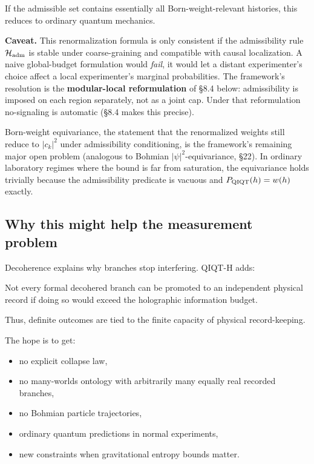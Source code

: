 \documentclass[11pt,a4paper]{article}
\newenvironment{qiqtquote}{\begin{mdframed}[style=quotestyle]}{\end{mdframed}}
\begin{document}
If the admissible set contains essentially all Born-weight-relevant histories, this reduces to ordinary quantum mechanics.

\textbf{Caveat.} This renormalization formula is only consistent if the admissibility rule $\mathcal{H}_{\rm adm}$ is stable under coarse-graining and compatible with causal localization. A naive global-budget formulation would \emph{fail}, it would let a distant experimenter's choice affect a local experimenter's marginal probabilities. The framework's resolution is the \textbf{modular-local reformulation} of §8.4 below: admissibility is imposed on each region separately, not as a joint cap. Under that reformulation no-signaling is automatic (§8.4 makes this precise).

Born-weight equivariance, the statement that the renormalized weights still reduce to $|c_k|^2$ under admissibility conditioning, is the framework's remaining major open problem (analogous to Bohmian $|\psi|^2$-equivariance, §22). In ordinary laboratory regimes where the bound is far from saturation, the equivariance holds trivially because the admissibility predicate is vacuous and $P_{\rm QIQT}(h) = w(h)$ exactly.

\subsection{Why this might help the measurement problem}

Decoherence explains why branches stop interfering. QIQT-H adds:

\begin{qiqtquote}
Not every formal decohered branch can be promoted to an independent physical record if doing so would exceed the holographic information budget.
\end{qiqtquote}

Thus, definite outcomes are tied to the finite capacity of physical record-keeping.

The hope is to get:

\begin{itemize}
  \item no explicit collapse law,
  \item no many-worlds ontology with arbitrarily many equally real recorded branches,
  \item no Bohmian particle trajectories,
  \item ordinary quantum predictions in normal experiments,
  \item new constraints when gravitational entropy bounds matter.
\end{itemize}
\end{document}
